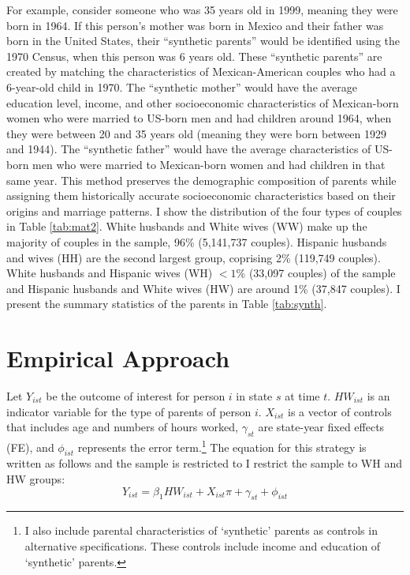 For example, consider someone who was 35 years old in 1999, meaning they were born in 1964. If this person's mother was born in Mexico and their father was born in the United States, their ``synthetic parents'' would be identified using the 1970 Census, when this person was 6 years old. These ``synthetic parents'' are created by matching the characteristics of Mexican-American couples who had a 6-year-old child in 1970. The ``synthetic mother'' would have the average education level, income, and other socioeconomic characteristics of Mexican-born women who were married to US-born men and had children around 1964, when they were between 20 and 35 years old (meaning they were born between 1929 and 1944). The ``synthetic father'' would have the average characteristics of US-born men who were married to Mexican-born women and had children in that same year. This method preserves the demographic composition of parents while assigning them historically accurate socioeconomic characteristics based on their origins and marriage patterns.
I show the distribution of the four types of couples in Table \ref{tab:mat2}. White husbands and White wives (WW) make up the majority of couples in the sample, 96\% (5,141,737 couples). Hispanic husbands and wives (HH) are the second largest group, coprising 2\% (119,749 couples). White husbands and Hispanic wives (WH) $< 1\%$ (33,097 couples) of the sample and Hispanic husbands and White wives (HW) are around 1\% (37,847 couples). I present the summary statistics of the parents in Table \ref{tab:synth}.

\section{Empirical Approach}\label{sec:emp_model}

Let $Y_{ist}$ be the outcome of interest for person $i$ in state $s$ at time $t$. $HW_{ist}$ is an indicator variable for the type of parents of person $i$. $X_{ist}$ is a vector of controls that includes age and numbers of hours worked, $\gamma_{st}$ are state-year fixed effects (FE), and $\phi_{ist}$ represents the error term.\footnote{I also include parental characteristics of `synthetic' parents as controls in alternative specifications. These controls include income and education of `synthetic' parents.} The equation for this strategy is written as follows and the sample is restricted to I restrict the sample to WH and HW groups:
\begin{equation} \label{eq:1a}
Y_{ist} = \beta_{1} HW_{ist} + X_{ist} \pi + \gamma_{st} + \phi_{ist}
\end{equation}

